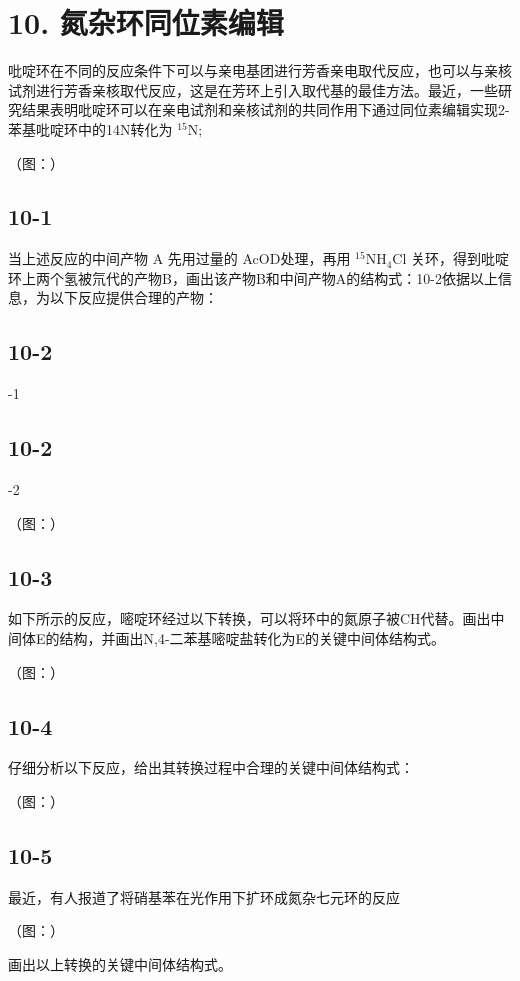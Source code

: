 \section*{10. 氮杂环同位素编辑}
吡啶环在不同的反应条件下可以与亲电基团进行芳香亲电取代反应，也可以与亲核试剂进行芳香亲核取代反应，这是在芳环上引入取代基的最佳方法。最近，一些研究结果表明吡啶环可以在亲电试剂和亲核试剂的共同作用下通过同位素编辑实现2-苯基吡啶环中的14N转化为 $^ { 1 5 } \mathrm { N } ;$

（图：）

\subsection*{10-1}
当上述反应的中间产物 A 先用过量的 AcOD处理，再用 $^ { 1 5 } \mathrm { { N H } _ { 4 } \mathrm { { C l } } }$ 关环，得到吡啶环上两个氢被氘代的产物B，画出该产物B和中间产物A的结构式：10-2依据以上信息，为以下反应提供合理的产物：

\subsection*{10-2}
-1

\subsection*{10-2}
-2

（图：）

\subsection*{10-3}
如下所示的反应，嘧啶环经过以下转换，可以将环中的氮原子被CH代替。画出中间体E的结构，并画出N,4-二苯基嘧啶盐转化为E的关键中间体结构式。

（图：）

\subsection*{10-4}
仔细分析以下反应，给出其转换过程中合理的关键中间体结构式：

（图：）

\subsection*{10-5}
最近，有人报道了将硝基苯在光作用下扩环成氮杂七元环的反应

（图：）

画出以上转换的关键中间体结构式。

